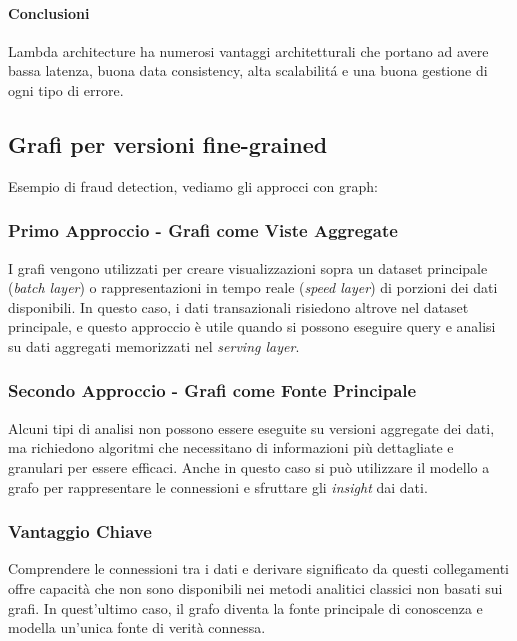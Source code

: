 \paragraph{Conclusioni} Lambda architecture ha numerosi vantaggi architetturali che portano ad avere bassa latenza, buona data consistency, alta scalabilitá e una buona gestione di ogni tipo di errore. 

\subsection{Grafi per versioni fine-grained}
Esempio di fraud detection, vediamo gli approcci con graph: 

\subsubsection*{Primo Approccio - Grafi come Viste Aggregate}

I grafi vengono utilizzati per creare visualizzazioni sopra un dataset principale (\textit{batch layer}) o rappresentazioni in tempo reale (\textit{speed layer}) di porzioni dei dati disponibili. In questo caso, i dati transazionali risiedono altrove nel dataset principale, e questo approccio è utile quando si possono eseguire query e analisi su dati aggregati memorizzati nel \textit{serving layer}.

\subsubsection*{Secondo Approccio - Grafi come Fonte Principale}

Alcuni tipi di analisi non possono essere eseguite su versioni aggregate dei dati, ma richiedono algoritmi che necessitano di informazioni più dettagliate e granulari per essere efficaci. Anche in questo caso si può utilizzare il modello a grafo per rappresentare le connessioni e sfruttare gli \textit{insight} dai dati.

\subsubsection*{Vantaggio Chiave}

Comprendere le connessioni tra i dati e derivare significato da questi collegamenti offre capacità che non sono disponibili nei metodi analitici classici non basati sui grafi. In quest'ultimo caso, il grafo diventa la fonte principale di conoscenza e modella un'unica fonte di verità connessa.

